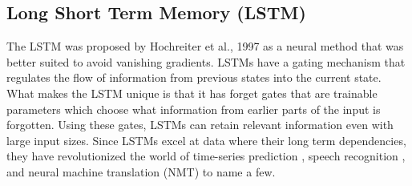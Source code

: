 \subsection{ Long  Short  Term  Memory (LSTM)}
\label{chap:prior:sec:arch:lstm}
The LSTM was proposed by Hochreiter et al.,  1997 \cite{Hochreiter1997LongSM} as a neural method that was better suited to avoid vanishing gradients. LSTMs have a gating mechanism that regulates the flow of information from previous states into the current state. What makes the LSTM unique is that it has forget gates that are trainable parameters which choose what information from earlier parts of the input is forgotten. Using these gates, LSTMs can retain relevant information even with large input sizes. Since LSTMs excel at data where their long term dependencies, they have revolutionized the world of time-series prediction \cite{Sagheer2019TimeSF}, speech recognition \cite{Han2017ESEES}, and neural machine translation (NMT) \cite{Jean2015OnUV} to name a few. 
